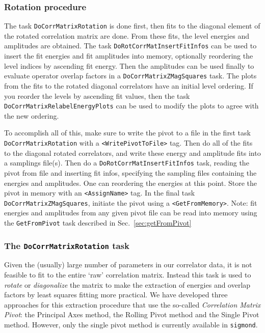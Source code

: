 \documentclass[12pt]{article}
\newcommand{\vb}{\texttt}
\begin{document}
\subsubsection{Rotation procedure}

The task \vb{DoCorrMatrixRotation} is done first, then fits to the diagonal     
element of the rotated correlation matrix are done.  From these fits,        
the level energies and amplitudes are obtained.  The task                    
\vb{DoRotCorrMatInsertFitInfos} can be used to insert the fit energies and  
fit amplitudes into memory, optionally reordering the level indices by       
ascending fit energy.  Then the amplitudes can be used finally to evaluate   
operator overlap factors in a \vb{DoCorrMatrixZMagSquares} task.  The plots     
from the fits to the rotated diagonal correlators have an initial level      
ordering.  If you reorder the levels by ascending fit values, then the       
task \vb{DoCorrMatrixRelabelEnergyPlots} can be used to modify the plots to     
agree with the new ordering.                                                 
                                                                             
To accomplish all of this, make sure to write the pivot to a file in the     
first task \newline \vb{DoCorrMatrixRotation} with a \vb{<WritePivotToFile>} tag.  Then       
do all of the fits to the diagonal rotated correlators, and write these      
energy and amplitude fits into a samplings file(s).  Then do a               
\vb{DoRotCorrMatInsertFitInfos} task, reading the pivot from file and inserting 
fit infos, specifying the sampling files containing the energies and         
amplitudes.  One can reordering the energies at this point.  Store the pivot 
in memory with an \vb{<AssignName>} tag. In the final task                        
\vb{DoCorrMatrixZMagSquares}, initiate the pivot using a \vb{<GetFromMemory>}.       
Note: fit energies and amplitudes from any given pivot file can be read into
memory using the \vb{GetFromPivot} task described in Sec.~\ref{sec:getFromPivot}

\subsubsection{The \vb{DoCorrMatrixRotation} task} 
\label{sec:rotation}
Given the (usually) large number of parameters in our correlator data,
it is not feasible to fit to the entire `raw' correlation matrix. Instead
this task is used to \textit{rotate} or \textit{diagonalize} the matrix to
make the extraction of energies and overlap factors by least squares fitting
more practical. We have developed three approaches for this extraction procedure that use
the so-called \textit{Correlation Matrix Pivot}: the Principal Axes method, the
Rolling Pivot method and the Single Pivot method.  However, only the single pivot
method is currently available in \vb{sigmond}.
\end{document}
